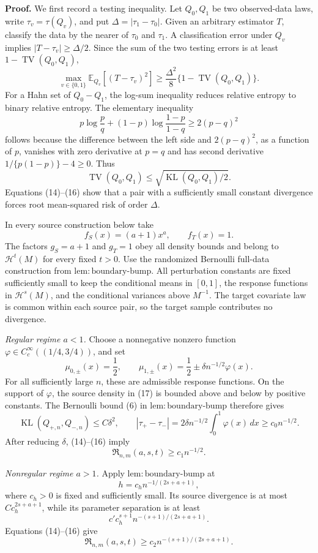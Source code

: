 \textbf{Proof.}
We first record a testing inequality. Let \(Q_0,Q_1\) be two observed-data laws, write \(\tau_v=\tau(Q_v)\), and put \(\Delta=|\tau_1-\tau_0|\). Given an arbitrary estimator \(T\), classify the data by the nearer of \(\tau_0\) and \(\tau_1\). A classification error under \(Q_v\) implies \(|T-\tau_v|\ge\Delta/2\). Since the sum of the two testing errors is at least \(1-\operatorname{TV}(Q_0,Q_1)\),
\[
\max_{v\in\{0,1\}}\mathbb E_{Q_v}[(T-\tau_v)^2]
\ge \frac{\Delta^2}{8}\{1-\operatorname{TV}(Q_0,Q_1)\}.
\tag{14}
\]
For a Hahn set of \(Q_0-Q_1\), the log-sum inequality reduces relative entropy to binary relative entropy. The elementary inequality
\[
p\log\frac pq+(1-p)\log\frac{1-p}{1-q}\ge2(p-q)^2
\tag{15}
\]
follows because the difference between the left side and \(2(p-q)^2\), as a function of \(p\), vanishes with zero derivative at \(p=q\) and has second derivative \(1/\{p(1-p)\}-4\ge0\). Thus
\[
\operatorname{TV}(Q_0,Q_1)
\le\sqrt{\operatorname{KL}(Q_0,Q_1)/2}.
\tag{16}
\]
Equations (14)--(16) show that a pair with a sufficiently small constant divergence forces root mean-squared risk of order \(\Delta\).

In every source construction below take
\[
f_S(x)=(a+1)x^a,
\qquad
f_T(x)=1.
\tag{17}
\]
The factors \(g_S=a+1\) and \(g_T=1\) obey all density bounds and belong to \(\mathcal H^t(M)\) for every fixed \(t>0\). Use the randomized Bernoulli full-data construction from \(\mathrm{lem:boundary\text{-}bump}\). All perturbation constants are fixed sufficiently small to keep the conditional means in \([0,1]\), the response functions in \(\mathcal H^s(M)\), and the conditional variances above \(M^{-1}\). The target covariate law is common within each source pair, so the target sample contributes no divergence.

\emph{Regular regime \(a<1\).}
Choose a nonnegative nonzero function \(\varphi\in C_c^\infty((1/4,3/4))\), and set
\[
\mu_{0,\pm}(x)=\frac12,
\qquad
\mu_{1,\pm}(x)=\frac12\pm\delta n^{-1/2}\varphi(x).
\tag{18}
\]
For all sufficiently large \(n\), these are admissible response functions. On the support of \(\varphi\), the source density in (17) is bounded above and below by positive constants. The Bernoulli bound (6) in \(\mathrm{lem:boundary\text{-}bump}\) therefore gives
\[
\operatorname{KL}(Q_{+,n},Q_{-,n})
\le C\delta^2,
\qquad
|\tau_+-\tau_-|
=2\delta n^{-1/2}\int_0^1\varphi(x)\,dx
\ge c_0n^{-1/2}.
\tag{19}
\]
After reducing \(\delta\), (14)--(16) imply
\[
\mathfrak R_{n,m}(a,s,t)\ge c_1n^{-1/2}.
\tag{20}
\]

\emph{Nonregular regime \(a>1\).}
Apply \(\mathrm{lem:boundary\text{-}bump}\) at
\[
h=c_hn^{-1/(2s+a+1)},
\tag{21}
\]
where \(c_h>0\) is fixed and sufficiently small. Its source divergence is at most \(Cc_h^{2s+a+1}\), while its parameter separation is at least
\[
c'c_h^{s+1}n^{-(s+1)/(2s+a+1)}.
\tag{22}
\]
Equations (14)--(16) give
\[
\mathfrak R_{n,m}(a,s,t)
\ge c_2n^{-(s+1)/(2s+a+1)}.
\tag{23}
\]

